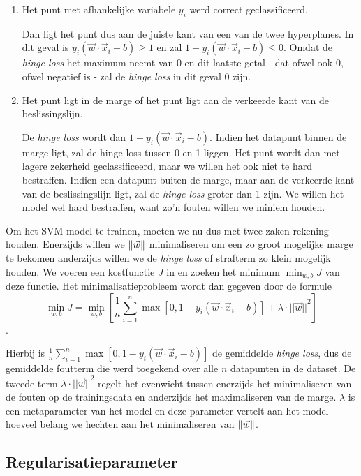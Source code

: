 \documentclass[TeamE-eindrapport]{subfiles}
\begin{document}
	\begin{enumerate}
		\item Het punt met afhankelijke variabele \(y_i\) werd correct geclassificeerd.
		
		Dan ligt het punt dus aan de juiste kant van een van de twee hyperplanes. In dit geval is \(y_i(\vec{w}\cdot\vec{x}_i-b)\ge1\) en zal \(1 - y_i(\vec{w}\cdot\vec{x}_i-b)\le0\). Omdat de \textit{hinge loss} het maximum neemt van 0 en dit laatste getal - dat ofwel ook 0, ofwel negatief is - zal de \textit{hinge loss} in dit geval 0 zijn.
		
		\item Het punt ligt in de marge of het punt ligt aan de verkeerde kant van de beslissingslijn. 
		
		De \textit{hinge loss} wordt dan \(1 - y_i(\vec{w}\cdot\vec{x}_i - b)\). Indien het datapunt binnen de marge ligt, zal de hinge loss tussen 0 en 1 liggen. Het punt wordt dan met lagere zekerheid geclassificeerd, maar we willen het ook niet te hard bestraffen. Indien een datapunt buiten de marge, maar aan de verkeerde kant van de beslissingslijn ligt, zal de \textit{hinge loss} groter dan 1 zijn. We willen het model wel hard bestraffen, want zo'n fouten willen we miniem houden.
	\end{enumerate}
	
	Om het SVM-model te trainen, moeten we nu dus met twee zaken rekening houden. Enerzijds willen we \(\left\| \vec{w} \right\|\) minimaliseren om een zo groot mogelijke marge te bekomen anderzijds willen we de \textit{hinge loss} of strafterm zo klein mogelijk houden. We voeren een kostfunctie \(J\) in en zoeken het minimum \(\min_{w, b}J\) van deze functie. Het minimalisatieprobleem wordt dan gegeven door de formule \[\min_{w, b}J=\min_{w, b}\left[\frac{1}{n}\sum_{i=1}^n{\max{[0,1-y_i(\vec{w}\cdot\vec{x}_i-b)]}} + \lambda\cdot{||\vec{w}||}^2\right]\].
	
	Hierbij is \(\frac{1}{n}\sum_{i=1}^n{\max{[0,1-y_i(\vec{w}\cdot\vec{x}_i-b)]}}\) de gemiddelde \textit{hinge loss}, dus de gemiddelde foutterm die werd toegekend over alle \(n\) datapunten in de dataset. De tweede term \(\lambda\cdot{||\vec{w}||}^2\) regelt het evenwicht tussen enerzijds het minimaliseren van de fouten op de trainingsdata en anderzijds het maximaliseren van de marge. \(\lambda\) is een metaparameter van het model en deze parameter vertelt aan het model hoeveel belang we hechten aan het minimaliseren van \(\left\| \vec{w} \right\|\). 
	
	\subsection{Regularisatieparameter}
	
\end{document}
